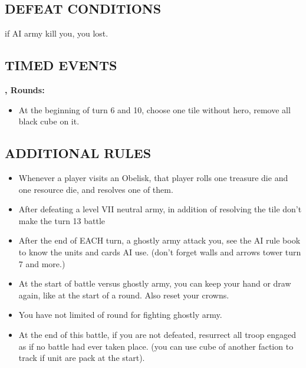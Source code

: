 \begin{multicols*}{2}
\subsection*{\MakeUppercase{Defeat Conditions}}

if AI army kill you, you lost.

\subsection*{\MakeUppercase{Timed Events}}

\textbf{,  Rounds:}
\begin{itemize}
  \item At the beginning of turn 6 and 10, choose one tile without hero, remove all black cube on it.
\end{itemize}

\subsection*{\MakeUppercase{Additional Rules}}
    \begin{itemize}
      \item Whenever a player visits an Obelisk, that player rolls one treasure die and one resource die, and resolves one of them.
      \item After defeating a level VII neutral army, in addition of resolving the tile don't make the turn 13 battle
      
      \item After the end of EACH turn, a ghostly army attack you, see the AI rule book to know the units and cards AI use. (don't forget walls
      and arrows tower turn 7 and more.)
      \item At the start of battle versus ghostly army, you can keep your hand or draw again, like at the start of a round. Also reset your crowns.
      \item You have not limited of round for fighting ghostly army.
      \item At the end of this battle, if you are not defeated, resurrect all troop engaged as if no battle had ever taken place. (you can use cube of another faction to track if unit are pack at the start).
    \end{itemize}
\end{multicols*}